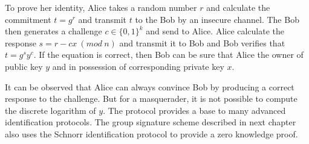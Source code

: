 To prove her identity, Alice takes a random number $r$ and calculate the commitment $t = g^r$ and transmit $t$ to the Bob by an insecure channel. The Bob then generates a challenge $c \in \{0, 1\}^k$ and send to Alice. Alice calculate the response $s = r - cx~(mod~n)$ and transmit it to Bob and Bob verifies that $t = g^s y^c$. If the equation is correct, then Bob can be sure that Alice the owner of public key $y$ and in possession of corresponding private key $x$. 

It can be observed that Alice can always convince Bob by producing a correct response to the challenge. But for a masquerader, it is not possible to compute the discrete logarithm of $y$. The protocol provides a base to many advanced identification protocols. The group signature scheme described in next chapter also uses the Schnorr identification protocol to provide a zero knowledge proof. 

